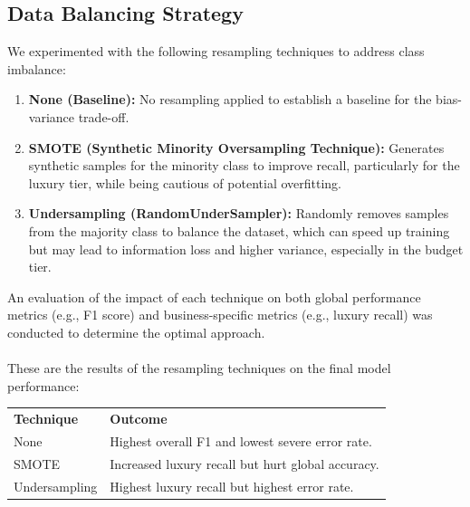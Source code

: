 \documentclass[12pt, a4paper]{article}
\begin{document}
\subsection{Data Balancing Strategy}
We experimented with the following resampling techniques to address class imbalance:
\begin{enumerate}
  \item \textbf{None (Baseline):} No resampling applied to establish a baseline for the bias-variance trade-off.
  \vspace{0.4cm}
  \item \textbf{SMOTE (Synthetic Minority Oversampling Technique):} Generates synthetic
        samples for the minority class to improve recall, particularly for the luxury tier, while being cautious of potential overfitting.
  \vspace{0.4cm}

  \item \textbf{Undersampling (RandomUnderSampler):} Randomly removes samples from the majority class to balance the dataset, which can speed up training but may lead to information
        loss and higher variance, especially in the budget tier.
\end{enumerate}
An evaluation of the impact of each technique on both global performance metrics (e.g., F1 score) and business-specific metrics (e.g., luxury recall) was conducted to determine the optimal approach.\\
\\These are the results of the resampling techniques on the final model performance:
\begin{center}
\renewcommand{\arraystretch}{1.4}
\begin{tabular}{p{3.5cm} p{9cm}}
  \rowcolor{slate}
  {\color{white}\small\bfseries Technique} &
  {\color{white}\small\bfseries Outcome} \\
  None & Highest overall F1 and lowest severe error rate. \\
  SMOTE & Increased luxury recall but hurt global accuracy. \\
  Undersampling & Highest luxury recall but highest error rate. \\
\end{tabular}
\end{center}
\end{document}
